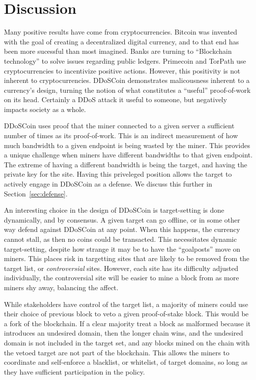 \section{Discussion}


Many positive results have come from cryptocurrencies.
Bitcoin was invented with the goal of creating a decentralized digital currency, 
and to that end has been more sucessful than most imagined. Banks are turning
to ``Blockchain technology'' to solve issues regarding public ledgers.
Primecoin and TorPath use cryptocurrencies to incentivize positive actions.
However, this positivity is not inherent to cryptocurrencies. DDoSCoin demonstrates
malicousness inherent to a currency's design, turning the notion of what constitutes
a ``useful'' proof-of-work on its head. Certainly a DDoS attack it useful to someone,
but negatively impacts society as a whole.

DDoSCoin uses proof that the miner connected to a given server a sufficient number 
of times as its proof-of-work. This is an indirect measurement of how much bandwidth
to a given endpoint is being wasted by the miner. This provides a unique challenge
when miners have different bandwidths to that given endpoint. The extreme of 
having a different bandwidth is being the target, and having the private key 
for the site. Having this priveleged position allows 
the target to actively engage in DDoSCoin as a defense. We discuss this further in
Section~\ref{sec:defense}.

An interesting choice in the design of DDoSCoin is target-setting is done 
dynamically, and by consensus. A given target can go offline, or in some other way
defend against DDoSCoin at any point. When this happens, the currency cannot stall,
as then no coins could be transacted. This necessitates dynamic target-setting, 
despite how strange it may be to have the ``goalposts'' move on miners. This places
risk in targetting sites that are likely to be removed from the target list, or
\emph{controversial} sites. However, each site has its difficulty adjusted 
individually, the controversial site will be easier to mine a block from as more 
miners shy away, balancing the affect. 

While stakeholders have control of the target list, a majority of miners could
use their choice of previous block to veto a given proof-of-stake block. This would
be a fork of the blockchain. If a clear majority treat a block as malformed because
it introduces an undesired domain, then the longer chain wins, and the undesired
domain is not included in the target set, and any blocks mined on the chain with
the vetoed target are not part of the blockchain. This allows the miners to coordinate
and self-enforce a blacklist, or whitelist, of target domains, so long as they 
have sufficient participation in the policy.

